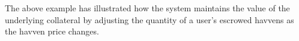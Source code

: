 \noindent The above example has illustrated how the system maintains the value of the underlying collateral by adjusting the quantity of a user's escrowed havvens as the havven price changes.










